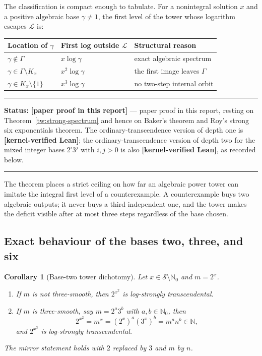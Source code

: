 \documentclass[11pt,oneside]{article}
\newtheorem{corollary}[theorem]{Corollary}
\theoremstyle{definition}
\theoremstyle{remark}
\newcommand{\N}{\mathbb N}
\newcommand{\Nzero}{\mathbb N_0}
\newcommand{\Sol}{\mathcal S}
\newcommand{\LL}{\mathcal L}
\newcommand{\GammaSat}{\Gamma}
\newcommand{\statuslean}{\textcolor{leanblue}{\textbf{[kernel-verified Lean]}}}
\newcommand{\statusnew}{\textcolor{newgreen}{\textbf{[paper proof in this report]}}}
\newenvironment{statusbox}[1]
{\begin{center}\begin{minipage}{0.94\textwidth}\raggedright\hbadness=10000\hrule
\vspace{0.45em}\textbf{Status:} #1\par\vspace{0.35em}}
{\vspace{0.35em}\hrule\end{minipage}\end{center}}
\begin{document}
The classification is compact enough to tabulate.  For a nonintegral solution $x$ and a
positive algebraic base $\gamma\ne1$, the first level of the tower whose logarithm escapes
$\LL$ is:

\begin{center}
\begin{tabular}{@{}p{}p{}p{}@{}}
\toprule
Location of $\gamma$ & First log outside $\LL$ & Structural reason\\
\midrule
$\gamma\notin\GammaSat$ & $x\log\gamma$ & exact algebraic spectrum\\
$\gamma\in\GammaSat\setminus K_x$ & $x^2\log\gamma$ & the first image leaves $\GammaSat$\\
$\gamma\in K_x\setminus\{1\}$ & $x^3\log\gamma$ & no two-step internal orbit\\
\bottomrule
\end{tabular}
\end{center}

\begin{statusbox}{\statusnew{} --- paper proof in this report, resting on
Theorem~\ref{tw:strong-spectrum} and hence on Baker's theorem and Roy's strong six
exponentials theorem.  The ordinary-transcendence version of depth one is \statuslean{}; the
ordinary-transcendence version of depth two for the mixed integer bases $2^i3^j$ with
$i,j>0$ is also \statuslean{}, as recorded below.}
\end{statusbox}

The theorem places a strict ceiling on how far an algebraic power tower can imitate the
integral first level of a counterexample.  A counterexample buys two algebraic outputs; it
never buys a third independent one, and the tower makes the deficit visible after at most
three steps regardless of the base chosen.

\subsection{Exact behaviour of the bases two, three, and six}

\begin{corollary}[Base-two tower dichotomy]
\label{tw:base2-tower}
Let $x\in\Sol\setminus\Nzero$ and $m=2^x$.
\begin{enumerate}[label=\textup{(\alph*)}]
\item If $m$ is not three-smooth, then $2^{x^2}$ is log-strongly transcendental.
\item If $m$ is three-smooth, say $m=2^a3^b$ with $a,b\in\Nzero$, then
\begin{equation}
 2^{x^2}=m^x=(2^x)^a(3^x)^b=m^an^b\in\N,
 \label{tw:eq-base2-integer}
\end{equation}
and $2^{x^3}$ is log-strongly transcendental.
\end{enumerate}
The mirror statement holds with $2$ replaced by $3$ and $m$ by $n$.
\end{corollary}
\end{document}
